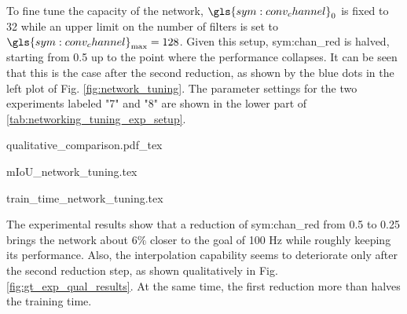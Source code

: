 To fine tune the capacity of the network, $\gls{sym:conv_channel}_0$ is fixed to 32 while an upper limit on the number of filters is set to $\gls{sym:conv_channel}_{\max}=128$. Given this setup, \gls{sym:chan_red} is halved, starting from 0.5 up to the point where the performance collapses. It can be seen that this is the case after the second reduction, as shown by the blue dots in the left plot of Fig. \ref{fig:network_tuning}. The parameter settings for the two experiments labeled "7" and "8" are shown in the lower part of \ref{tab:networking_tuning_exp_setup}. 
\begin{center}
	{qualitative_comparison.pdf_tex}
\end{center}
\begin{center}
	\begin{minipage}{.5\textwidth}
		{mIoU_network_tuning.tex}
	\end{minipage}
	\hfill
	\begin{minipage}{.47\textwidth}
		{train_time_network_tuning.tex} 
	\end{minipage}
\end{center}
The experimental results show that a reduction of \gls{sym:chan_red} from 0.5 to 0.25 brings the network about $6\%$ closer to the goal of 100 Hz while roughly keeping its performance. Also, the interpolation capability seems to deteriorate only after the second reduction step, as shown qualitatively in Fig. \ref{fig:gt_exp_qual_results}. At the same time, the first reduction more than halves the training time.
%
